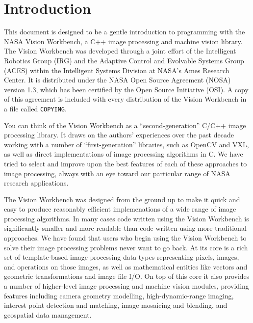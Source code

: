 \chapter{Introduction}

This document is designed to be a gentle introduction to programming
with the NASA Vision Workbench, a C++ image processing and machine
vision library.  The Vision Workbench was developed through a joint
effort of the Intelligent Robotics Group (IRG) and the Adaptive
Control and Evolvable Systems Group (ACES) within the Intelligent
Systems Division at NASA's Ames Research Center.  It is distributed
under the NASA Open Source Agreement (NOSA) version 1.3, which has
been certified by the Open Source Initiative (OSI).  A copy of this
agreement is included with every distribution of the Vision Workbench
in a file called {\tt COPYING}.

You can think of the Vision Workbench as a ``second-generation'' C/C++
image processing library.  It draws on the authors' experiences over
the past decade working with a number of ``first-generation''
libraries, such as OpenCV and VXL, as well as direct implementations
of image processing algorithms in C.  We have tried to select and
improve upon the best features of each of these approaches to image
processing, always with an eye toward our particular range of NASA
research applications.

The Vision Workbench was designed from the ground up to make it quick
and easy to produce reasonably efficient implemenations of a wide
range of image processing algorithms.  In many cases code written
using the Vision Workbench is significantly smaller and more readable
than code written using more traditional approaches.  We have found
that users who begin using the Vision Workbench to solve their image
processing problems never want to go back.  At its core is a rich set
of template-based image processing data types representing pixels,
images, and operations on those images, as well as mathematical
entities like vectors and geometric transformations and image file
I/O.  On top of this core it also provides a number of higher-level
image processing and machine vision modules, providing features
including camera geometry modelling, high-dynamic-range imaging,
interest point detection and matching, image mosaicing and blending,
and geospatial data management.

